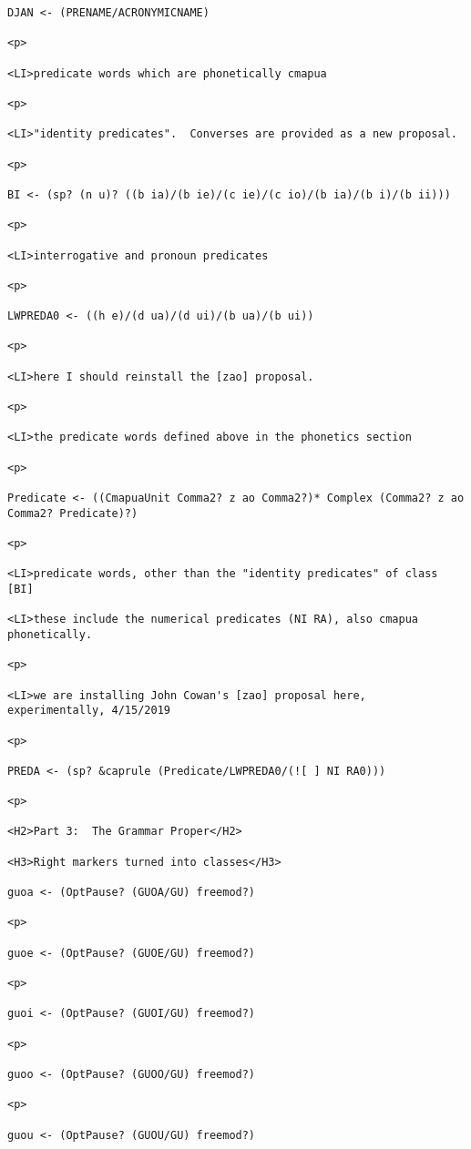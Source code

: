 \documentclass[12pt]{article}
\begin{document}
\begin{lstlisting}
DJAN <- (PRENAME/ACRONYMICNAME)

<p>

<LI>predicate words which are phonetically cmapua

<p>

<LI>"identity predicates".  Converses are provided as a new proposal.

<p>

BI <- (sp? (n u)? ((b ia)/(b ie)/(c ie)/(c io)/(b ia)/(b i)/(b ii)))

<p>

<LI>interrogative and pronoun predicates

<p>

LWPREDA0 <- ((h e)/(d ua)/(d ui)/(b ua)/(b ui))

<p>

<LI>here I should reinstall the [zao] proposal.

<p>

<LI>the predicate words defined above in the phonetics section

<p>

Predicate <- ((CmapuaUnit Comma2? z ao Comma2?)* Complex (Comma2? z ao Comma2? Predicate)?)

<p>

<LI>predicate words, other than the "identity predicates" of class [BI]

<LI>these include the numerical predicates (NI RA), also cmapua phonetically.

<p>

<LI>we are installing John Cowan's [zao] proposal here, experimentally, 4/15/2019

<p>

PREDA <- (sp? &caprule (Predicate/LWPREDA0/(![ ] NI RA0)))

<p>

<H2>Part 3:  The Grammar Proper</H2>

<H3>Right markers turned into classes</H3>

guoa <- (OptPause? (GUOA/GU) freemod?)

<p>

guoe <- (OptPause? (GUOE/GU) freemod?)

<p>

guoi <- (OptPause? (GUOI/GU) freemod?)

<p>

guoo <- (OptPause? (GUOO/GU) freemod?)

<p>

guou <- (OptPause? (GUOU/GU) freemod?)


\end{lstlisting}
\end{document}
